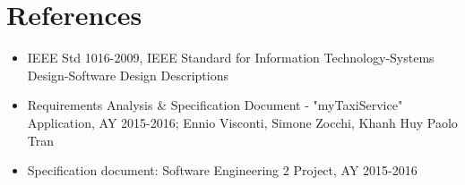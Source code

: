 
\section{References}

\begin{itemize}
\item IEEE Std 1016-2009, IEEE Standard for Information Technology-Systems Design-Software Design Descriptions
\item Requirements Analysis \& Specification Document - "myTaxiService" Application, AY 2015-2016; Ennio Visconti, Simone Zocchi, Khanh Huy Paolo Tran
\item Specification document: Software Engineering 2 Project, AY 2015-2016
\end{itemize}